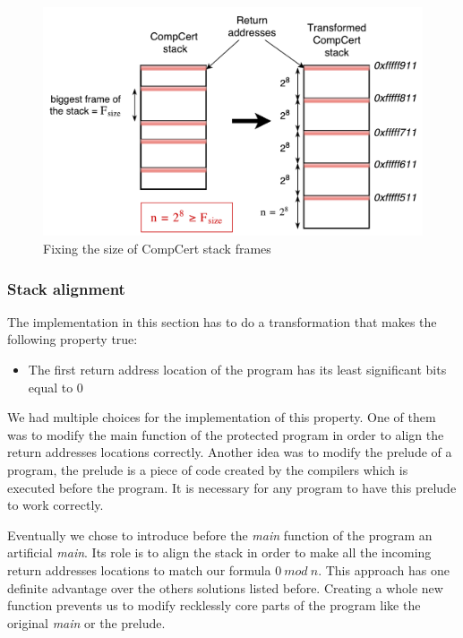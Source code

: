 \documentclass[11pt]{sdm}
\begin{document}
\begin{figure}[!ht]
\centering
\includegraphics[scale=0.6]{images/stack_transform.pdf}
\caption{Fixing the size of CompCert stack frames}
\label{stack_transform}
\end{figure}

\subsubsection{Stack alignment}
\label{ssub:Stack alignment}

The implementation in this section has to do a transformation that makes the following property true:
\begin{itemize}
	\item The first return address location of the program has its least significant bits equal to 0
\end{itemize}

We had multiple choices for the implementation of this property. One of them was to modify the main function of the protected program in order to align the return addresses locations correctly. Another idea was to modify the prelude of a program, the prelude is a piece of code created by the compilers which is executed before the program. It is necessary for any program to have this prelude to work correctly.

Eventually we chose to introduce before the \textit{main} function of the program an artificial \textit{main}. Its role is to align the stack in order to make all the incoming return addresses locations to match our formula $0~mod~n$. 
This approach has one definite advantage over the others solutions listed before. Creating a whole new function prevents us to modify recklessly core parts of the program like the original \textit{main} or the prelude. \hfill \break
\end{document}
